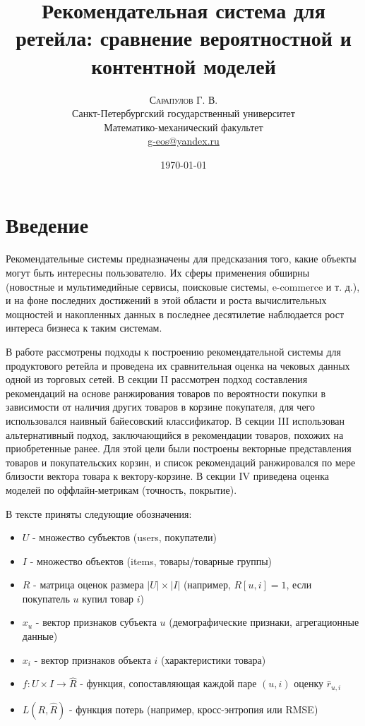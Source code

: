 \documentclass{article}
\title{Рекомендательная система для ретейла: сравнение вероятностной и контентной моделей} %
\author{%
\textsc{Сарапулов Г. В.} \\ %
\normalsize Санкт-Петербургский государственный университет \\ %
\normalsize Математико-механический факультет \\ %
\normalsize \href{mailto:john@smith.com}{g-eos@yandex.ru} %
}
\date{\today} %
\begin{document}
\maketitle


\section{Введение}
Рекомендательные системы предназначены для предсказания того, какие объекты могут быть интересны пользователю. Их сферы применения обширны (новостные и мультимедийные сервисы, поисковые системы, e-commerce и т. д.), и на фоне последних достижений в этой области и роста вычислительных мощностей и накопленных данных в последнее десятилетие наблюдается рост интереса бизнеса к таким системам. \par
В работе рассмотрены подходы к построению рекомендательной системы для продуктового ретейла и проведена их сравнительная оценка на чековых данных одной из торговых сетей. В секции II рассмотрен подход составления рекомендаций на основе ранжирования товаров по вероятности покупки в зависимости от наличия других товаров в корзине покупателя, для чего использовался наивный байесовский классификатор. В секции III использован альтернативный подход, заключающийся в рекомендации товаров, похожих на приобретенные ранее. Для этой цели были построены векторные представления товаров и покупательских корзин, и список рекомендаций ранжировался по мере близости вектора товара к вектору-корзине. В секции IV приведена оценка моделей по оффлайн-метрикам (точность, покрытие). \par
В тексте приняты следующие обозначения:
\begin{itemize}
\item $U$ - множество субъектов (users, покупатели)
\item $I$ - множество объектов (items, товары/товарные группы)
\item $R$ - матрица оценок размера $|U| \times |I|$ (например, $R[u, i] = 1$, если покупатель $u$ купил товар $i$)
\item $x_u$ - вектор признаков субъекта $u$ (демографические признаки, агрегационные данные)
\item $x_i$ - вектор признаков объекта $i$ (характеристики товара)
\item $f: U \times I \rightarrow \hat R$ - функция, сопоставляющая каждой паре $(u, i)$ оценку $\hat r_{u,i}$
\item $L(R, \hat R)$ - функция потерь (например, кросс-энтропия или RMSE)
 \end{itemize}
 
\end{document}
